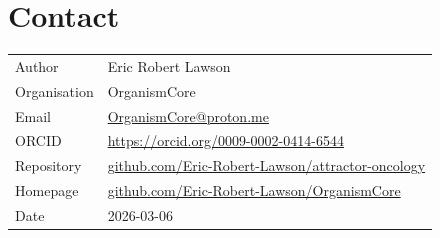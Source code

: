 \documentclass[12pt, a4paper]{article}
\begin{document}
\section*{Contact}

\begin{tabular}{ll}
Author        & Eric Robert Lawson \\
Organisation  & OrganismCore \\
Email         &
  \href{mailto:OrganismCore@proton.me}
       {OrganismCore@proton.me} \\
ORCID         &
  \href{https://orcid.org/0009-0002-0414-6544}
       {https://orcid.org/0009-0002-0414-6544} \\
Repository    &
  \href{https://github.com/Eric-Robert-Lawson/attractor-oncology}
       {github.com/Eric-Robert-Lawson/attractor-oncology} \\
Homepage      &
  \href{https://github.com/Eric-Robert-Lawson/OrganismCore}
       {github.com/Eric-Robert-Lawson/OrganismCore} \\
Date          & 2026-03-06 \\
\end{tabular}

\end{document}
